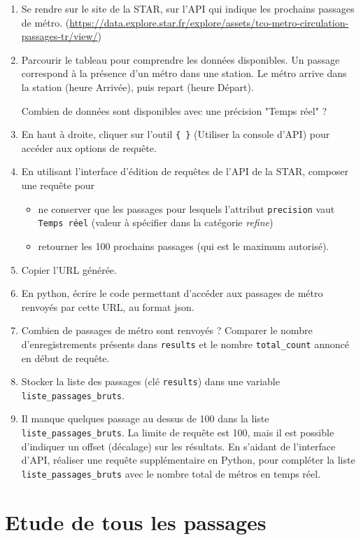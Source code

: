 \documentclass[11pt,a4paper]{article}
\begin{document}
\begin{enumerate}
    \item Se rendre sur le site de la STAR, sur l'API qui indique les prochains passages de métro. (\url{https://data.explore.star.fr/explore/assets/tco-metro-circulation-passages-tr/view/})
    \item Parcourir le tableau pour comprendre les données disponibles. Un passage correspond à la présence d'un métro dans une station. Le métro arrive dans la station (heure Arrivée), puis repart (heure Départ). 
    
    Combien de données sont disponibles avec une précision "Temps réel" ? 
    \item En haut à droite, cliquer sur l'outil \verb+{ }+ (Utiliser la console d'API) pour accéder aux options de requête.
    \item En utilisant l'interface d'édition de requêtes de l'API de la STAR, composer une requête pour 
    \begin{itemize}
        \item ne conserver que les passages pour lesquels l'attribut \verb+precision+ vaut \verb+Temps réel+ (valeur à spécifier dans la catégorie \emph{refine})
        \item retourner les 100 prochains passages (qui est le maximum autorisé).
    \end{itemize}
    \item Copier l'URL générée.
    \item En python, écrire le code permettant d'accéder aux passages de métro renvoyés par cette URL, au format json. 
    \item Combien de passages de métro sont renvoyés ? Comparer le nombre d'enregistrements présents dans \verb+results+ et le nombre \verb+total_count+ annoncé en début de requête.
    \item Stocker la liste des passages (clé \verb+results+) dans une variable \verb+liste_passages_bruts+.
    \item Il manque quelques passage au dessus de 100 dans la liste \verb+liste_passages_bruts+. La limite de requête est 100, mais il est possible d'indiquer un offset (décalage) sur les résultats. En s'aidant de l'interface d'API, réaliser une requête supplémentaire en Python, pour compléter la liste \verb+liste_passages_bruts+ avec le nombre total de métros en temps réel.
\end{enumerate}

\section{Etude de tous les passages}
\end{document}
